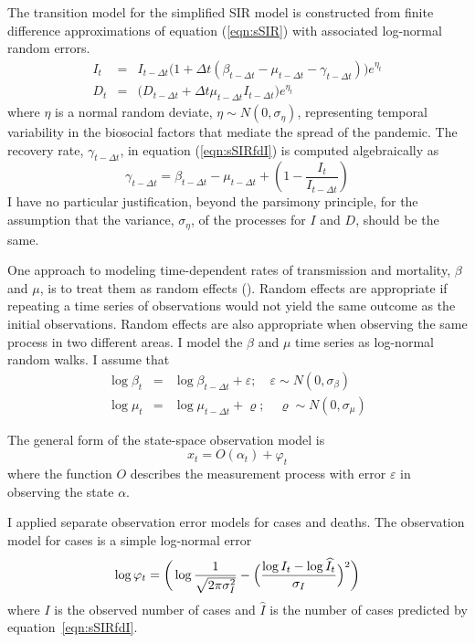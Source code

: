 \documentclass[12pt,letterpaper]{article}
\begin{document}
The transition model for the simplified SIR model is constructed from finite difference
approximations of equation (\ref{eqn:sSIR}) with associated log-normal
random errors.
\begin{eqnarray}
\label{eqn:sSIRfdI}
I_t &=& I_{t-\Delta t}\big(1+\Delta t(\beta_{t-\Delta t} - \mu_{t-\Delta t}
- \gamma_{t-\Delta t})\big)e^{\eta_t}\\
\label{eqn:sSIRfdD}
D_t &=& \big(D_{t-\Delta t} + \Delta t \mu_{t-\Delta t}I_{t-\Delta
t}\big)e^{\eta_t}
\end{eqnarray}
where $\eta$ is a normal random deviate, $\eta\sim
N(0,\sigma_\eta)$, representing temporal variability in the biosocial
factors that mediate the spread of the pandemic. 
The recovery rate, $\gamma_{t-\Delta t}$, in equation
(\ref{eqn:sSIRfdI}) is computed algebraically as
\begin{equation}
\gamma_{t-\Delta t} = \beta_{t-\Delta t} - \mu_{t-\Delta t} +
(1-\frac{I_t}{I_{t-\Delta t}})
\end{equation}
I have no particular
justification, beyond the parsimony principle, for the assumption that
the variance, $\sigma_\eta$, of the processes for $I$ and $D$, should be the
same.

One approach to modeling time-dependent rates of transmission and
mortality, $\beta$ and $\mu$, is to treat them as random effects
(\cite{Skaug2006}). Random effects are appropriate if repeating a time
series of observations would not yield the same outcome as the initial
observations. Random effects are also appropriate when observing
the same process in two different areas. I model the  $\beta$ and
$\mu$ time series as log-normal random walks. I assume that
\begin{eqnarray}
\log\beta_t &=& \log\beta_{t-\Delta t}+\varepsilon;\quad \varepsilon\sim 
N(0,\sigma_\beta)\\
\log\mu_t &=& \log\mu_{t-\Delta t}+\varrho;\quad \varrho\sim
N(0,\sigma_\mu)
\end{eqnarray}

The general form of the state-space observation model is
\begin{equation}
x_t = O(\alpha_t) + \varphi_t
\end{equation}
where the function $O$ describes the measurement process with
error $\varepsilon$ in observing the state $\alpha$.

I applied separate observation error models for cases and
deaths. The observation model for cases is a simple log-normal error
\begin{equation}
\label{eqn:logNlike}
\log\varphi_t = \bigg(\log\frac{1}{\sqrt{2\pi\sigma^2_I}} -\Bigl(\frac{\log
I_t-\log\widehat{I}_t}{\sigma_I}\Bigr)^2\bigg)\\
\end{equation}
where $I$ is the observed number of cases and $\widehat{I}$ is the
number of cases predicted by equation~\ref{eqn:sSIRfdI}.
\end{document}
